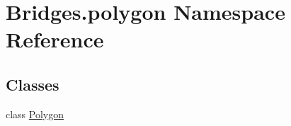 \hypertarget{namespace_bridges_1_1polygon}{}\section{Bridges.\+polygon Namespace Reference}
\label{namespace_bridges_1_1polygon}
\subsection*{Classes}
\begin{DoxyCompactItemize}
\item 
class \mbox{\hyperlink{class_bridges_1_1polygon_1_1_polygon}{Polygon}}
\end{DoxyCompactItemize}
